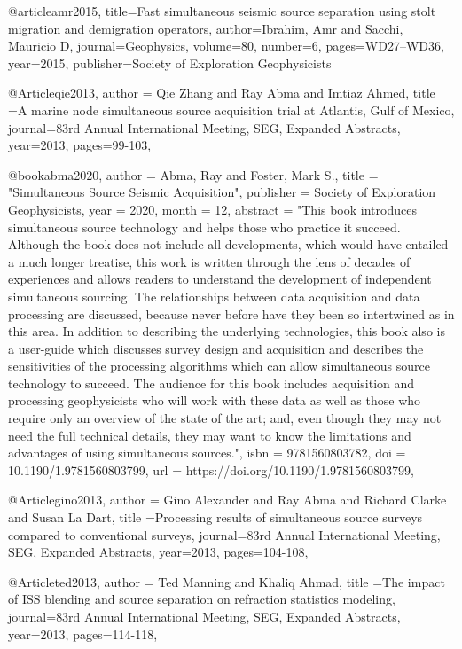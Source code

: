 @article{amr2015,
  title={Fast simultaneous seismic source separation using stolt migration and demigration operators},
  author={Ibrahim, Amr and Sacchi, Mauricio D},
  journal={Geophysics},
  volume={80},
  number={6},
  pages={WD27--WD36},
  year={2015},
  publisher={Society of Exploration Geophysicists}
}

@Article{qie2013,
  author = {Qie Zhang and Ray Abma and Imtiaz Ahmed},
  title ={A marine node simultaneous source acquisition trial at Atlantis, Gulf of Mexico},
  journal={83rd Annual International Meeting, SEG, Expanded Abstracts},
  year=2013,
  pages={99-103},
}

@book{abma2020,
    author = {Abma, Ray and Foster, Mark S.},
    title = "{Simultaneous Source Seismic Acquisition}",
    publisher = {Society of Exploration Geophysicists},
    year = {2020},
    month = {12},
    abstract = "{This book introduces simultaneous source technology and helps those who practice it succeed. Although the book does not include all developments, which would have entailed a much longer treatise, this work is written through the lens of decades of experiences and allows readers to understand the development of independent simultaneous sourcing. The relationships between data acquisition and data processing are discussed, because never before have they been so intertwined as in this area. In addition to describing the underlying technologies, this book also is a user-guide which discusses survey design and acquisition and describes the sensitivities of the processing algorithms which can allow simultaneous source technology to succeed. The audience for this book includes acquisition and processing geophysicists who will work with these data as well as those who require only an overview of the state of the art; and, even though they may not need the full technical details, they may want to know the limitations and advantages of using simultaneous sources.}",
    isbn = {9781560803782},
    doi = {10.1190/1.9781560803799},
    url = {https://doi.org/10.1190/1.9781560803799},
}




@Article{gino2013,
  author = {Gino Alexander and Ray Abma and Richard Clarke and Susan La Dart},
  title ={Processing results of simultaneous source surveys compared to conventional surveys},
  journal={83rd Annual International Meeting, SEG, Expanded Abstracts},
  year=2013,
  pages={104-108},
}

@Article{ted2013,
  author = {Ted Manning and Khaliq Ahmad},
  title ={The impact of ISS blending and source separation on refraction statistics modeling},
  journal={83rd Annual International Meeting, SEG, Expanded Abstracts},
  year=2013,
  pages={114-118},
}

